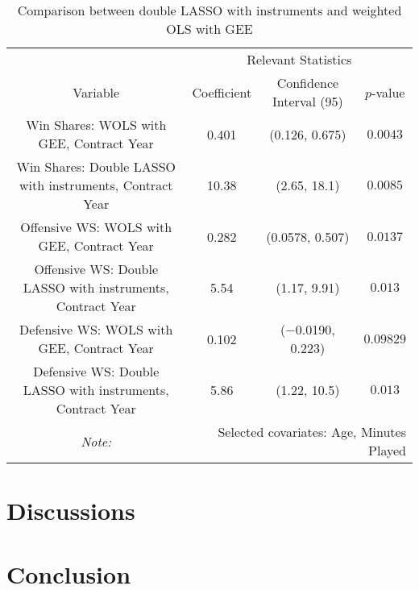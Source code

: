 \documentclass[12pt]{article}
\begin{document}
	\begin{landscape}
		\begin{table}[!htbp]
		\centering
		\caption{Comparison between double LASSO with instruments and weighted OLS with GEE}
		\label{lassoivvsgee} 
		\begin{tabular}{*4c}
			\toprule
			& \multicolumn{3}{c}{Relevant Statistics} \\
			\cmidrule(lr){2-4}
			Variable & Coefficient  & Confidence Interval (95) & $p$-value \\
			\midrule
			Win Shares: WOLS with GEE, Contract Year & 0.401       & (0.126, 0.675) & $0.0043$       \\
			Win Shares: Double LASSO with instruments, Contract Year & 10.38       & (2.65, 18.1) & $0.0085$       \\
			Offensive WS: WOLS with GEE, Contract Year & 0.282       & (0.0578, 0.507) & $0.0137$       \\
			Offensive WS: Double LASSO with instruments, Contract Year & 5.54       & (1.17, 9.91) & $0.013$       \\
			Defensive WS: WOLS with GEE, Contract Year & 0.102       & ($-$0.0190, 0.223) & $0.09829$       \\
			Defensive WS: Double LASSO with instruments, Contract Year & 5.86       & (1.22, 10.5) & $0.013$       \\
			\bottomrule
			\textit{Note:}  & \multicolumn{3}{r}{Selected covariates: Age, Minutes Played} \\
		\end{tabular}
	\end{table}
	\end{landscape}

	\pagebreak
	
	\section{Discussions} \label{sec:discussion}
	
	\section{Conclusion} \label{sec:conclusion}
	
	\clearpage
	
	\singlespacing
	
	
	
	
	
	\clearpage
	
\end{document}
